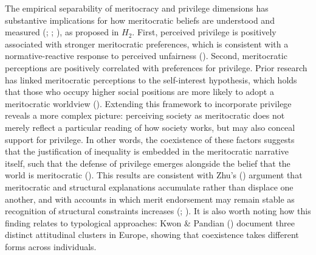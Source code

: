 \documentclass[
  13pt,
]{article}
\begin{document}
The empirical separability of meritocracy and privilege dimensions has
substantive implications for how meritocratic beliefs are understood and
measured (; ;
), as proposed in
\(H_2\). First, perceived privilege is positively associated with
stronger meritocratic preferences, which is consistent with a
normative-reactive response to perceived unfairness
().
Second, meritocratic perceptions are positively correlated with
preferences for privilege. Prior research has linked meritocratic
perceptions to the self-interest hypothesis, which holds that those who
occupy higher social positions are more likely to adopt a meritocratic
worldview ().
Extending this framework to incorporate privilege reveals a more complex
picture: perceiving society as meritocratic does not merely reflect a
particular reading of how society works, but may also conceal support
for privilege. In other words, the coexistence of these factors suggests
that the justification of inequality is embedded in the meritocratic
narrative itself, such that the defense of privilege emerges alongside
the belief that the world is meritocratic
(). This results
are consistent with Zhu's ()
argument that meritocratic and structural explanations accumulate rather
than displace one another, and with accounts in which merit endorsement
may remain stable as recognition of structural constraints increases
(;
). It is also
worth noting how this finding relates to typological approaches: Kwon \&
Pandian () document
three distinct attitudinal clusters in Europe, showing that coexistence
takes different forms across individuals.
\end{document}
